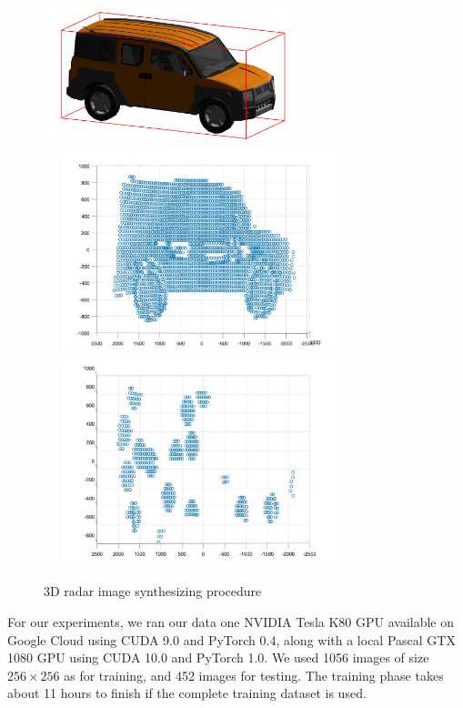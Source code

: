 \begin{figure}
	\centering
	\includegraphics[width=7.5cm,height=4cm]{./figure/CAD.png}\\
	\includegraphics[width=9cm,height=6cm]{./figure/side.jpg}\\
	\includegraphics[width=9cm,height=6cm]{./figure/specular.jpg}\\
	\caption{3D radar image synthesizing procedure}
	\label{3D_synth}
\end{figure}

For our experiments, we ran our data one NVIDIA Tesla K80 GPU available on Google Cloud using CUDA 9.0 and PyTorch 0.4, along with a local Pascal GTX 1080 GPU using CUDA 10.0 and PyTorch 1.0. We used 1056 images of size $256 \times 256$ as for training, and 452 images for testing. The training phase takes about 11 hours to finish if the complete training dataset is used.

